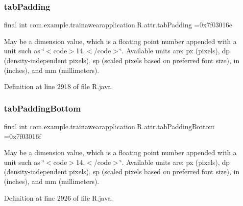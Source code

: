 \subsubsection{\texorpdfstring{tabPadding}{tabPadding}}
{\footnotesize\ttfamily final int com.\+example.\+trainawearapplication.\+R.\+attr.\+tab\+Padding =0x7f03016e\hspace{0.3cm}{\ttfamily [static]}}

May be a dimension value, which is a floating point number appended with a unit such as \char`\"{}$<$code$>$14.\+5sp$<$/code$>$\char`\"{}. Available units are\+: px (pixels), dp (density-\/independent pixels), sp (scaled pixels based on preferred font size), in (inches), and mm (millimeters). 

Definition at line 2918 of file R.\+java.

\mbox{\label{classcom_1_1example_1_1trainawearapplication_1_1_r_1_1attr_a3f92c8446b11e2e424883e60986f32bb}} 
\subsubsection{\texorpdfstring{tabPaddingBottom}{tabPaddingBottom}}
{\footnotesize\ttfamily final int com.\+example.\+trainawearapplication.\+R.\+attr.\+tab\+Padding\+Bottom =0x7f03016f\hspace{0.3cm}{\ttfamily [static]}}

May be a dimension value, which is a floating point number appended with a unit such as \char`\"{}$<$code$>$14.\+5sp$<$/code$>$\char`\"{}. Available units are\+: px (pixels), dp (density-\/independent pixels), sp (scaled pixels based on preferred font size), in (inches), and mm (millimeters). 

Definition at line 2926 of file R.\+java.

\mbox{\label{classcom_1_1example_1_1trainawearapplication_1_1_r_1_1attr_a034c23069692bab8f23351e9e226686e}} 
